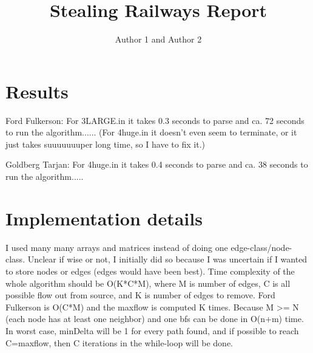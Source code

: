 \documentclass{article}
\title{Stealing Railways Report}
\author{Author 1 and Author 2}
\begin{document}
  \maketitle

  \section{Results}

  
  Ford Fulkerson:
  For 3LARGE.in it takes 0.3 seconds to parse and ca. 72 seconds to run the algorithm......
  (For 4huge.in it doesn't even seem to terminate, or it just takes suuuuuuuper long time, so I have to fix it.)
  
  Goldberg Tarjan:
  For 4huge.in it takes 0.4 seconds to parse and ca. 38 seconds to run the algorithm.....



  \section{Implementation details}

	I used many many arrays and matrices instead of doing one edge-class/node-class. Unclear if wise or not, I initially did so because I was uncertain if I wanted to store nodes or edges (edges would have been best).
    Time complexity of the whole algorithm should be O(K*C*M), where M is number of edges, C is all possible flow out from source, and K is number of edges to remove.
    Ford Fulkerson is O(C*M) and the maxflow is computed K times.
    Because M >= N (each node has at least one neighbor) and one bfs can be done in O(n+m) time.
    In worst case, minDelta will be 1 for every path found, and if possible to reach C=maxflow, then C iterations in the while-loop will be done.
\end{document}
